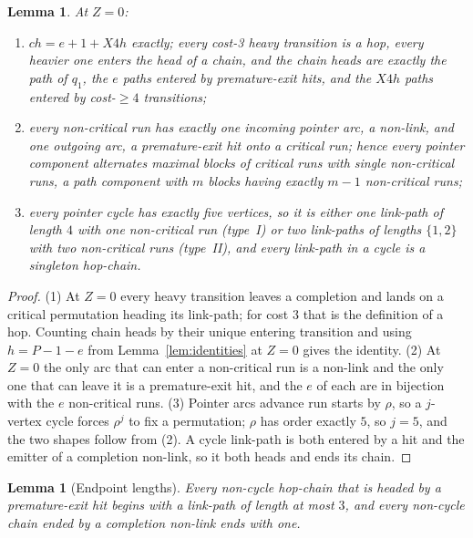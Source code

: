 \documentclass[10pt]{article}
\newtheorem{lemma}[theorem]{Lemma}
\theoremstyle{remark}
\theoremstyle{plain}
\newcommand{\NCh}{\mathit{ch}}
\begin{document}
\begin{lemma}\label{lem:rigid}
At $Z=0$:
\begin{enumerate}
\item $\NCh=e+1+X4h$ exactly; every cost-3 heavy transition is a hop,
  every heavier one enters the head of a chain, and the chain heads are
  exactly the path of $q_1$, the $e$ paths entered by premature-exit
  hits, and the $X4h$ paths entered by cost-$\ge4$ transitions;
\item every non-critical run has exactly one incoming pointer arc, a
  non-link, and one outgoing arc, a premature-exit hit onto a critical
  run; hence every pointer component alternates maximal blocks of
  critical runs with single non-critical runs, a path component with
  $m$ blocks having exactly $m-1$ non-critical runs;
\item every pointer cycle has exactly five vertices, so it is either
  one link-path of length $4$ with one non-critical run (type~I) or two
  link-paths of lengths $\{1,2\}$ with two non-critical runs
  (type~II), and every link-path in a cycle is a singleton hop-chain.
\end{enumerate}
\end{lemma}

\begin{proof}
(1) At $Z=0$ every heavy transition leaves a completion and lands on a
critical permutation heading its link-path; for cost $3$ that is the
definition of a hop.  Counting chain heads by their unique entering
transition and using $h=P-1-e$ from Lemma~\ref{lem:identities} at
$Z=0$ gives the identity.  (2) At $Z=0$ the only arc that can enter a
non-critical run is a non-link and the only one that can leave it is a
premature-exit hit, and the $e$ of each are in bijection with the $e$
non-critical runs.  (3) Pointer arcs advance run starts by $\rho$, so a
$j$-vertex cycle forces $\rho^{j}$ to fix a permutation; $\rho$ has
order exactly $5$, so $j=5$, and the two shapes follow from (2).  A
cycle link-path is both entered by a hit and the emitter of a
completion non-link, so it both heads and ends its chain.
\end{proof}

\begin{lemma}[Endpoint lengths]\label{lem:endpoint}
Every non-cycle hop-chain that is headed by a premature-exit hit begins
with a link-path of length at most $3$, and every non-cycle chain ended
by a completion non-link ends with one.
\end{lemma}
\end{document}
